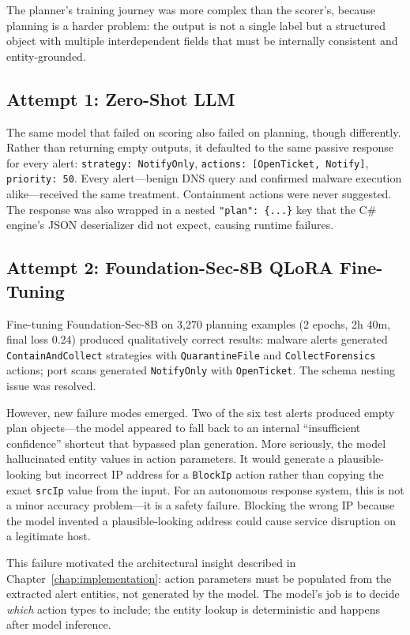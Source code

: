 The planner's training journey was more complex than the scorer's, because planning is a harder problem: the output is not a single label but a structured object with multiple interdependent fields that must be internally consistent and entity-grounded.

\subsection{Attempt 1: Zero-Shot LLM}

The same model that failed on scoring also failed on planning, though differently. Rather than returning empty outputs, it defaulted to the same passive response for every alert: \texttt{strategy: NotifyOnly}, \texttt{actions: [OpenTicket, Notify]}, \texttt{priority: 50}. Every alert---benign DNS query and confirmed malware execution alike---received the same treatment. Containment actions were never suggested. The response was also wrapped in a nested \texttt{"plan": \{...\}} key that the C\# engine's JSON deserializer did not expect, causing runtime failures.

\subsection{Attempt 2: Foundation-Sec-8B QLoRA Fine-Tuning}

Fine-tuning Foundation-Sec-8B on 3,270 planning examples (2 epochs, 2h 40m, final loss 0.24) produced qualitatively correct results: malware alerts generated \texttt{ContainAndCollect} strategies with \texttt{QuarantineFile} and \texttt{CollectForensics} actions; port scans generated \texttt{NotifyOnly} with \texttt{OpenTicket}. The schema nesting issue was resolved.

However, new failure modes emerged. Two of the six test alerts produced empty plan objects---the model appeared to fall back to an internal ``insufficient confidence'' shortcut that bypassed plan generation. More seriously, the model hallucinated entity values in action parameters. It would generate a plausible-looking but incorrect IP address for a \texttt{BlockIp} action rather than copying the exact \texttt{srcIp} value from the input. For an autonomous response system, this is not a minor accuracy problem---it is a safety failure. Blocking the wrong IP because the model invented a plausible-looking address could cause service disruption on a legitimate host.

This failure motivated the architectural insight described in Chapter~\ref{chap:implementation}: action parameters must be populated from the extracted alert entities, not generated by the model. The model's job is to decide \emph{which} action types to include; the entity lookup is deterministic and happens after model inference.

